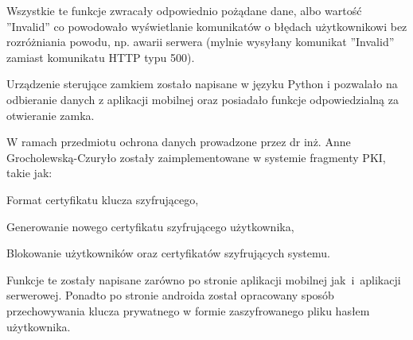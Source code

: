 	Wszystkie te funkcje zwracały odpowiednio pożądane dane, albo wartość ''Invalid'' co powodowało wyświetlanie komunikatów o błędach użytkownikowi bez rozróżniania powodu, np. awarii serwera (mylnie wysyłany komunikat ''Invalid'' zamiast komunikatu HTTP typu 500).
	
	Urządzenie sterujące zamkiem zostało napisane w języku Python i pozwalało na odbieranie danych z aplikacji mobilnej oraz posiadało funkcje odpowiedzialną za otwieranie zamka.

	W ramach przedmiotu ochrona danych prowadzone przez dr inż. Anne Grocholewską-Czuryło zostały zaimplementowane w systemie fragmenty PKI, takie jak:
	   \begin{itemize*}
	   	\item Format certyfikatu klucza szyfrującego,
	   	\item Generowanie nowego certyfikatu szyfrującego użytkownika,
	   	\item Blokowanie użytkowników oraz certyfikatów szyfrujących systemu.
	   \end{itemize*}
   
	 Funkcje te zostały napisane zarówno po stronie aplikacji mobilnej jak~i~aplikacji serwerowej. Ponadto po stronie androida został opracowany sposób przechowywania klucza prywatnego w formie zaszyfrowanego pliku hasłem użytkownika.

